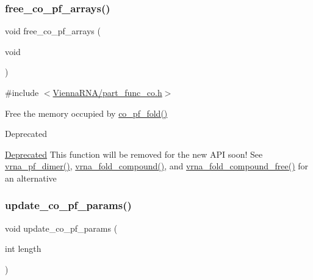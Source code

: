 \subsubsection{\texorpdfstring{free\_co\_pf\_arrays()}{free\_co\_pf\_arrays()}}
{\footnotesize\ttfamily void free\+\_\+co\+\_\+pf\+\_\+arrays (\begin{DoxyParamCaption}\item[{void}]{ }\end{DoxyParamCaption})}



{\ttfamily \#include $<$\mbox{\hyperlink{part__func__co_8h}{Vienna\+R\+N\+A/part\+\_\+func\+\_\+co.\+h}}$>$}



Free the memory occupied by \mbox{\hyperlink{group__part__func__global__deprecated_gae5c1e7331718669bdae7a86de2be6184}{co\+\_\+pf\+\_\+fold()}} 

\begin{DoxyRefDesc}{Deprecated}
\item[\mbox{\hyperlink{deprecated__deprecated000118}{Deprecated}}]This function will be removed for the new A\+PI soon! See \mbox{\hyperlink{group__part__func__global_ga4e5c7d06c302a7c59fc0d64dc142ca63}{vrna\+\_\+pf\+\_\+dimer()}}, \mbox{\hyperlink{group__fold__compound_ga6601d994ba32b11511b36f68b08403be}{vrna\+\_\+fold\+\_\+compound()}}, and \mbox{\hyperlink{group__fold__compound_ga576a077b418a9c3650e06f8e5d296fc2}{vrna\+\_\+fold\+\_\+compound\+\_\+free()}} for an alternative\end{DoxyRefDesc}
\mbox{\label{group__part__func__global__deprecated_ga6e0f36c1f9b7d9dd4bfbad914c1119e5}} 
\subsubsection{\texorpdfstring{update\_co\_pf\_params()}{update\_co\_pf\_params()}}
{\footnotesize\ttfamily void update\+\_\+co\+\_\+pf\+\_\+params (\begin{DoxyParamCaption}\item[{int}]{length }\end{DoxyParamCaption})}



